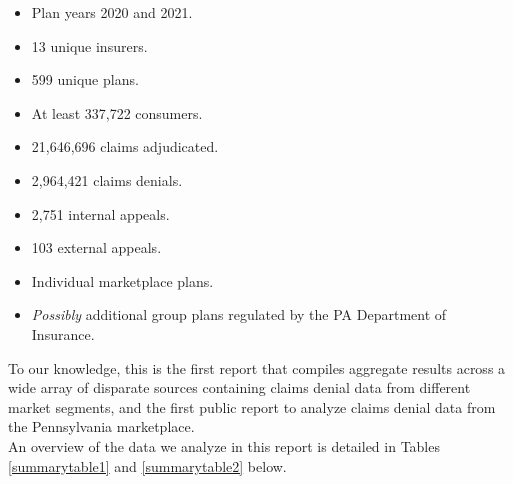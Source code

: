 \documentclass[12pt, a4paper,twoside]{report}
\theoremstyle{plain} %
\theoremstyle{definition} %
\theoremstyle{remark} %
\numberwithin{equation}{chapter}
\begin{document}
\begin{itemize}
\begin{tcolorbox}
			\begin{itemize}
				\item Plan years 2020 and 2021.
				\item 13 unique insurers.
				\item 599 unique plans.
				\item At least 337,722 consumers.
				\item 21,646,696 claims adjudicated.
				\item 2,964,421 claims denials.
				\item 2,751 internal appeals.
				\item 103 external appeals.
				\item Individual marketplace plans.
				\item \emph{Possibly} additional group plans regulated by the PA Department of Insurance.
			\end{itemize}
		\end{tcolorbox}
	
	
	
		\end{itemize}
	
		
		To our knowledge, this is the first report that compiles aggregate results across a wide array of disparate sources containing claims denial data from different market segments, and the first public report to analyze claims denial data from the Pennsylvania marketplace.\\
		
		An overview of the data we analyze in this report is detailed in Tables \ref{summarytable1} and \ref{summarytable2} below.\\
		
\end{document}
